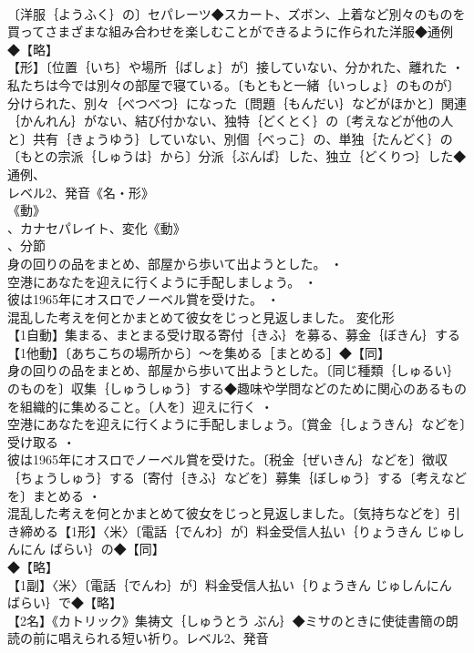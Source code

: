\documentclass[8pt]{extreport}
\begin{document}
\begin{CJK}{UTF8}{min}
\\	〔洋服｛ようふく｝の〕セパレーツ◆スカート、ズボン、上着など別々のものを買ってさまざまな組み合わせを楽しむことができるように作られた洋服◆通例
\\	◆【略】
\\	【形】〔位置｛いち｝や場所｛ばしょ｝が〕接していない、分かれた、離れた ・
\\	私たちは今では別々の部屋で寝ている。〔もともと一緒｛いっしょ｝のものが〕分けられた、別々｛べつべつ｝になった〔問題｛もんだい｝などがほかと〕関連｛かんれん｝がない、結び付かない、独特｛どくとく｝の〔考えなどが他の人と〕共有｛きょうゆう｝していない、別個｛べっこ｝の、単独｛たんどく｝の〔もとの宗派｛しゅうは｝から〕分派｛ぶんぱ｝した、独立｛どくりつ｝した◆通例、
\\	レベル2、発音《名・形》
\\	《動》
\\	、カナセパレイト、変化《動》
\\	、分節
\\	身の回りの品をまとめ、部屋から歩いて出ようとした。 ・
\\	空港にあなたを迎えに行くように手配しましょう。 ・
\\	彼は1965年にオスロでノーベル賞を受けた。 ・
\\	混乱した考えを何とかまとめて彼女をじっと見返しました。	変化形 
\\	【1自動】集まる、まとまる受け取る寄付｛きふ｝を募る、募金｛ぼきん｝する【1他動】〔あちこちの場所から〕～を集める［まとめる］◆【同】
\\	身の回りの品をまとめ、部屋から歩いて出ようとした。〔同じ種類｛しゅるい｝のものを〕収集｛しゅうしゅう｝する◆趣味や学問などのために関心のあるものを組織的に集めること。〔人を〕迎えに行く ・
\\	空港にあなたを迎えに行くように手配しましょう。〔賞金｛しょうきん｝などを〕受け取る ・
\\	彼は1965年にオスロでノーベル賞を受けた。〔税金｛ぜいきん｝などを〕徴収｛ちょうしゅう｝する〔寄付｛きふ｝などを〕募集｛ぼしゅう｝する〔考えなどを〕まとめる ・
\\	混乱した考えを何とかまとめて彼女をじっと見返しました。〔気持ちなどを〕引き締める【1形】〈米〉〔電話｛でんわ｝が〕料金受信人払い｛りょうきん じゅしんにん ばらい｝の◆【同】
\\	◆【略】
\\	【1副】〈米〉〔電話｛でんわ｝が〕料金受信人払い｛りょうきん じゅしんにん ばらい｝で◆【略】
\\	【2名】《カトリック》集祷文｛しゅうとう ぶん｝◆ミサのときに使徒書簡の朗読の前に唱えられる短い祈り。レベル2、発音

\end{CJK}
\end{document}

